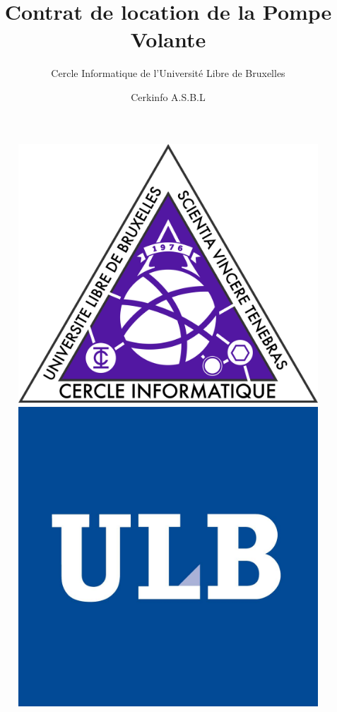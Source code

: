 \documentclass{article}
\title{Contrat de location de la Pompe Volante}
\author{Cercle Informatique de l'Université Libre de Bruxelles}
\date{Cerkinfo A.S.B.L}
\begin{document}
\begin{figure}
	\includegraphics[scale=0.03]{images/ci.png}
	\hfill
	\includegraphics[scale=0.4]{images/ulb.png}
  \label{fig:ci}
\end{figure}

\maketitle
\end{document}
